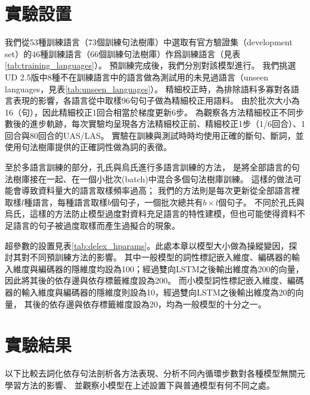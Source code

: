 \section{實驗設置}
\label{sec:delex_depparse_setting}



我們從53種訓練語言（73個訓練句法樹庫）中選取有官方驗證集（development set）的46種訓練語言（66個訓練句法樹庫）作爲訓練語言（見表\ref{tab:training_languages}）。
預訓練完成後，我們分別對該模型進行。
我們挑選UD 2.5版中8種不在訓練語言中的語言做為測試用的未見過語言（unseen languages，見表\ref{tab:unseen_languages}）。
精細校正時，為排除語料多寡對各語言表現的影響，各語言從中取樣96句句子做為精細校正用語料。
由於批次大小為16（句），因此精細校正1回合相當於梯度更新6步。
為觀察各方法精細校正不同步數後的進步軌跡，每次實驗均呈現各方法精細校正前、精細校正1步（1/6回合）、1回合與80回合的UAS/LAS。
實驗在訓練與測試時時均使用正確的斷句、斷詞，並使用句法樹庫提供的正確詞性做為詞的表徵。


至於多語言訓練的部分，孔氏\cite{kondratyuk-straka-2019-75}與烏氏\cite{ustun2020udapter}進行多語言訓練的方法，
是將全部語言的句法樹庫接在一起、在一個小批次(batch)中混合多個句法樹庫訓練。
這樣的做法可能會導致資料量大的語言取樣頻率過高；
我們的方法則是每次更新從全部語言裡取樣$l$種語言，每種語言取樣$b$個句子，一個批次總共有$b \times l$個句子。
不同於孔氏與烏氏，這樣的方法防止模型過度對資料充足語言的特性建模，但也可能使得資料不足語言的句子被過度取樣而產生過擬合的現象。

超參數的設置見表\ref{tab:delex_hparams}。此處本章以模型大小做為操縱變因，探討其對不同預訓練方法的影響。
其中一般模型的詞性標記嵌入維度、編碼器的輸入維度與編碼器的隱維度均設為100；經過雙向LSTM之後輸出維度為200的向量，
因此將其後的依存邊與依存標籤維度設為200。
而小模型詞性標記嵌入維度、編碼器的輸入維度與編碼器的隱維度則設為10，經過雙向LSTM之後輸出維度為20的向量，
其後的依存邊與依存標籤維度設為20，均為一般模型的十分之一。

\section{實驗結果}
以下比較去詞化依存句法剖析各方法表現、分析不同內循環步數對各種模型無關元學習方法的影響、
並觀察小模型在上述設置下與普通模型有何不同之處。
